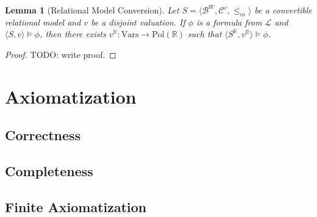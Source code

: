\documentclass{article}
\newtheorem*{lemma}{Lemma}
\newcommand{\R}{\mathbb{R}}
\newcommand{\B}{\mathcal{B}}
\newcommand{\lang}{\mathcal{L}}
\newcommand{\Vars}{\text{Vars}}
\newcommand{\Pol}{\text{Pol}}
\begin{document}
\begin{lemma}[Relational Model Conversion]
  Let $S = \langle \B^W, \mathcal{C}^c, \leq_m \rangle$ be a convertible relational model and $v$ be a disjoint valuation. If $\phi$ is a formula from $\lang$ and $\langle S, v \rangle \models \phi$, then there exists $v^\R: \Vars \rightarrow \Pol(\R)$ such that $\langle S^\R, v^\R \rangle \models \phi$.
\end{lemma}
\begin{proof}
  TODO: write proof.
\end{proof}
\section{Axiomatization}
\subsection{Correctness}
\subsection{Completeness}
\subsection{Finite Axiomatization}
\end{document}
